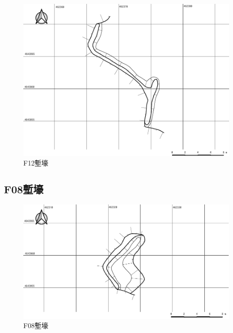 \documentclass[14Q]{jsarticle}
\begin{document}
\begin{figure}[h]
\centering
\includegraphics[width=160truemm]{fig/F12.pdf}
\caption{F12塹壕}
\label{f12}
\end{figure}

\subsection{F08塹壕}

\begin{figure}[h]
\centering
\includegraphics[width=160truemm]{fig/F08.pdf}
\caption{F08塹壕}
\label{f08}
\end{figure}
\end{document}
